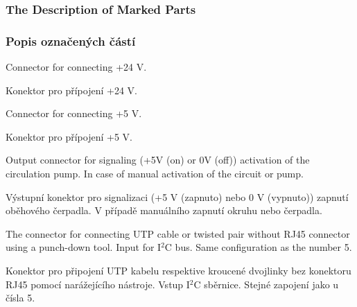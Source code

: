 \begin{English}
\subsubsection{The Description of Marked Parts}
\end{English}

\begin{Czech}
\subsubsection{Popis označených částí}
\end{Czech}


\begin{English}
Connector for connecting +24 V.
\end{English}

\begin{Czech}
Konektor pro přípojení +24 V.
\end{Czech}


\begin{English}
Connector for connecting +5 V.
\end{English}

\begin{Czech}
Konektor pro přípojení +5 V.
\end{Czech}


\begin{English}
Output connector for signaling (+5V (on) or 0V (off)) activation of the circulation pump. In case of manual activation of the circuit or pump.
\end{English}

\begin{Czech}
Výstupní konektor pro signalizaci (+5 V (zapnuto) nebo 0 V (vypnuto)) zapnutí oběhového čerpadla. V případě manuálního zapnutí okruhu nebo čerpadla.
\end{Czech}


\begin{English}
The connector for connecting UTP cable or twisted pair without RJ45 connector using a punch-down tool. Input for I$^2$C bus. Same configuration as the number 5.
\end{English}

\begin{Czech}
Konektor pro připojení UTP kabelu respektive kroucené dvojlinky bez konektoru RJ45 pomocí narážejícího nástroje. Vstup I$^2$C sběrnice. Stejné zapojení jako u čísla 5.
\end{Czech}


